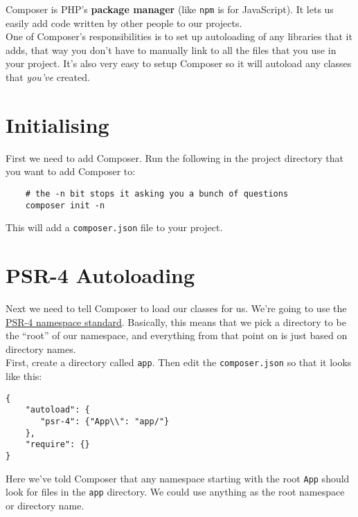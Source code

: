 Composer is PHP's \textbf{package manager} (like \texttt{npm} is for JavaScript). It lets us easily add code written by other people to our projects.
\\

One of Composer's responsibilities is to set up autoloading of any libraries that it adds, that way you don't have to manually link to all the files that you use in your project. It's also very easy to setup Composer so it will autoload any classes that \textit{you've} created.


\section{Initialising}

First we need to add Composer. Run the following in the project directory that you want to add Composer to:

\begin{verbatim}
    # the -n bit stops it asking you a bunch of questions
    composer init -n
\end{verbatim}

This will add a \texttt{composer.json} file to your project.



\section{PSR-4 Autoloading}

Next we need to tell Composer to load our classes for us. We're going to use the \href{https://www.php-fig.org/psr/psr-4/}{PSR-4 namespace standard}. Basically, this means that we pick a directory to be the ``root'' of our namespace, and everything from that point on is just based on directory names.
\\

First, create a directory called \texttt{app}. Then edit the \texttt{composer.json} so that it looks like this:

\begin{verbatim}
{
    "autoload": {
       "psr-4": {"App\\": "app/"}
    },
    "require": {}
}
\end{verbatim}

Here we've told Composer that any namespace starting with the root \texttt{App} should look for files in the \texttt{app} directory. We could use anything as the root namespace or directory name.
\\

